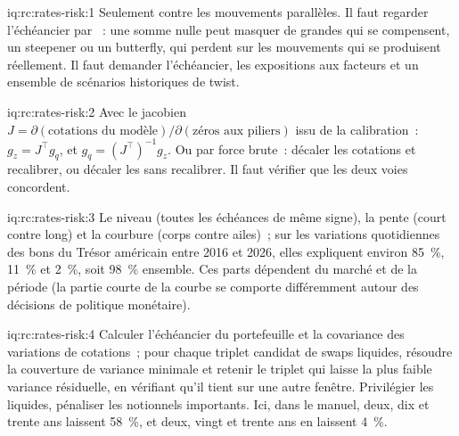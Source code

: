 \begin{solution}{iq:rc:rates-risk:1}
Seulement contre les mouvements parallèles. Il faut regarder l'échéancier par ~: une somme nulle peut masquer
de grandes  qui se compensent, un steepener ou un butterfly, qui perdent sur les
mouvements qui se produisent réellement. Il faut demander l'échéancier, les expositions aux facteurs et un ensemble de
scénarios historiques de twist.
\end{solution}

\begin{solution}{iq:rc:rates-risk:2}
Avec le jacobien $J = \partial(\text{cotations du modèle})/\partial(\text{zéros aux
piliers})$ issu de la calibration~: $g_z = J^\top g_q$, et $g_q =
(J^\top)^{-1}g_z$. Ou par force brute~: décaler les cotations et recalibrer, ou décaler
les  sans recalibrer. Il faut vérifier que les deux voies concordent.
\end{solution}

\begin{solution}{iq:rc:rates-risk:3}
Le niveau (toutes les échéances de même signe), la pente (court contre long) et la courbure
(corps contre ailes)~; sur les variations quotidiennes des bons du Trésor américain entre 2016 et 2026, elles expliquent
environ 85~\%, 11~\% et 2~\%, soit 98~\% ensemble. Ces parts dépendent du marché et
de la période (la partie courte de la courbe se comporte différemment autour des décisions de politique monétaire).
\end{solution}

\begin{solution}{iq:rc:rates-risk:4}
Calculer l'échéancier du portefeuille et la covariance des variations de cotations~; pour chaque
triplet candidat de swaps liquides, résoudre la couverture de variance minimale et retenir le
triplet qui laisse la plus faible variance résiduelle, en vérifiant qu'il tient sur une autre
fenêtre. Privilégier les  liquides, pénaliser les notionnels importants. Ici, dans le manuel,
deux, dix et trente ans laissent 58~\%, et deux, vingt et trente ans en laissent 4~\%.
\end{solution}

